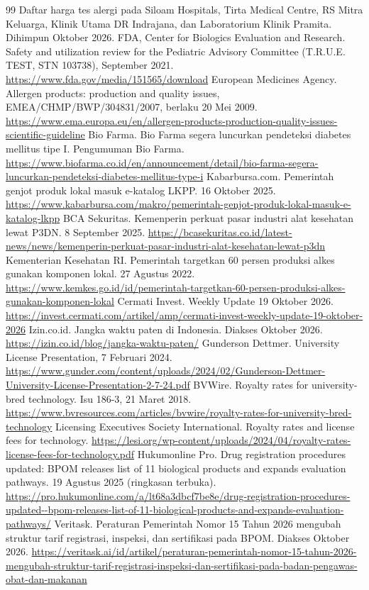 \documentclass[11pt,a4paper]{article}
\begin{document}
\begin{thebibliography}{99}
 Daftar harga tes alergi pada Siloam Hospitals, Tirta Medical Centre, RS Mitra Keluarga, Klinik Utama DR Indrajana, dan Laboratorium Klinik Pramita. Dihimpun Oktober 2026.
 FDA, Center for Biologics Evaluation and Research. Safety and utilization review for the Pediatric Advisory Committee (T.R.U.E. TEST, STN 103738), September 2021. \url{https://www.fda.gov/media/151565/download}
 European Medicines Agency. Allergen products: production and quality issues, EMEA/CHMP/BWP/304831/2007, berlaku 20 Mei 2009. \url{https://www.ema.europa.eu/en/allergen-products-production-quality-issues-scientific-guideline}
 Bio Farma. Bio Farma segera luncurkan pendeteksi diabetes mellitus tipe I. Pengumuman Bio Farma. \url{https://www.biofarma.co.id/en/announcement/detail/bio-farma-segera-luncurkan-pendeteksi-diabetes-mellitus-type-i}
 Kabarbursa.com. Pemerintah genjot produk lokal masuk e-katalog LKPP. 16 Oktober 2025. \url{https://www.kabarbursa.com/makro/pemerintah-genjot-produk-lokal-masuk-e-katalog-lkpp}
 BCA Sekuritas. Kemenperin perkuat pasar industri alat kesehatan lewat P3DN. 8 September 2025. \url{https://bcasekuritas.co.id/latest-news/news/kemenperin-perkuat-pasar-industri-alat-kesehatan-lewat-p3dn}
 Kementerian Kesehatan RI. Pemerintah targetkan 60 persen produksi alkes gunakan komponen lokal. 27 Agustus 2022. \url{https://www.kemkes.go.id/id/pemerintah-targetkan-60-persen-produksi-alkes-gunakan-komponen-lokal}
 Cermati Invest. Weekly Update 19 Oktober 2026. \url{https://invest.cermati.com/artikel/amp/cermati-invest-weekly-update-19-oktober-2026}
 Izin.co.id. Jangka waktu paten di Indonesia. Diakses Oktober 2026. \url{https://izin.co.id/blog/jangka-waktu-paten/}
 Gunderson Dettmer. University License Presentation, 7 Februari 2024. \url{https://www.gunder.com/content/uploads/2024/02/Gunderson-Dettmer-University-License-Presentation-2-7-24.pdf}
 BVWire. Royalty rates for university-bred technology. Isu 186-3, 21 Maret 2018. \url{https://www.bvresources.com/articles/bvwire/royalty-rates-for-university-bred-technology}
 Licensing Executives Society International. Royalty rates and license fees for technology. \url{https://lesi.org/wp-content/uploads/2024/04/royalty-rates-license-fees-for-technology.pdf}
 Hukumonline Pro. Drug registration procedures updated: BPOM releases list of 11 biological products and expands evaluation pathways. 19 Agustus 2025 (ringkasan terbuka). \url{https://pro.hukumonline.com/a/lt68a3dbcf7be8e/drug-registration-procedures-updated--bpom-releases-list-of-11-biological-products-and-expands-evaluation-pathways/}
 Veritask. Peraturan Pemerintah Nomor 15 Tahun 2026 mengubah struktur tarif registrasi, inspeksi, dan sertifikasi pada BPOM. Diakses Oktober 2026. \url{https://veritask.ai/id/artikel/peraturan-pemerintah-nomor-15-tahun-2026-mengubah-struktur-tarif-registrasi-inspeksi-dan-sertifikasi-pada-badan-pengawas-obat-dan-makanan}
\end{thebibliography}
\end{document}
